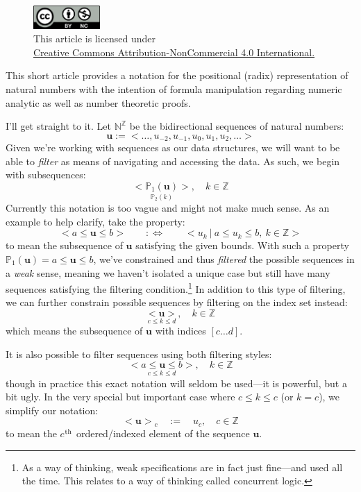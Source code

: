 \documentclass[twoside]{article}
\renewcommand{\th}{$ ^{\mbox{\scriptsize th}} $ }
\newcommand{\seq}[1][u]{\ensuremath{<\!#1\!>}}
\newcommand{\bseq}[1][u]{\ensuremath{<\!\!\bm{#1}\!\!>}}
\begin{document}
\begin{figure}[h]
\centering
\includegraphics[width=1in]{../../../cc-by-nc.png}\\[0.1in]
\tiny This article is licensed under \\
\href{http://creativecommons.org/licenses/by-nc/4.0/}
{Creative Commons Attribution-NonCommercial 4.0 International.}\\[0.3in]
\end{figure}

This short article provides a notation for the positional (radix) representation of natural numbers with the intention
of formula manipulation regarding numeric analytic as well as number theoretic proofs.

I'll get straight to it. Let $ \mathbb{N}^\mathbb{Z} $ be the bidirectional sequences of natural numbers:
$$ \bm{u}:=<\ldots, u_{-2}, u_{-1}, u_0, u_{1}, u_{2},\ldots> $$
Given we're working with sequences as our data structures, we will want to be able to \emph{filter} as means
of navigating and accessing the data. As such, we begin with subsequences:
$$ \underset{\mathbb{P}_2(k)}{\seq[\mathbb{P}_1(\bm{u})]},\quad k\in\mathbb{Z} $$
Currently this notation is too vague and might not make much sense. As an example to help clarify, take the property:
$$ \seq[a\le\bm{u}\le b]\qquad:\Longleftrightarrow\qquad <u_k\ |\ a\le u_k\le b,\ k\in\mathbb{Z}> $$
to mean the subsequence of $ \bm{u} $ satisfying the given bounds.  With such a property $ \mathbb{P}_1(\bm{u})=a\le\bm{u}\le b $,
we've constrained and thus \emph{filtered} the possible sequences in a \emph{weak} sense, meaning we haven't isolated a
unique case but still have many sequences satisfying the filtering condition.\footnote{As a way of thinking, weak specifications
are in fact just fine---and used all the time. This relates to a way of thinking called concurrent logic.}
In addition to this type of filtering, we can further constrain possible sequences by filtering on the index set instead:
$$ \underset{c\le k\le d}{\bseq},\quad k\in\mathbb{Z} $$
which means the subsequence of $ \bm{u} $ with indices $ [c\ldots d] $.

It is also possible to filter sequences using both filtering styles:
$$ \underset{c\le k\le d}{\seq[a\le\bm{u}\le b]},\quad k\in\mathbb{Z} $$
though in practice this exact notation will seldom be used---it is powerful, but a bit ugly.
In the very special but important case where $ c\le k\le c $ (or $ k=c $), we simplify our notation:
$$ \bseq_c\quad:=\quad u_c,\quad c\in\mathbb{Z} $$
to mean the $ c $\th ordered/indexed element of the sequence $ \bm{u} $.
\end{document}
